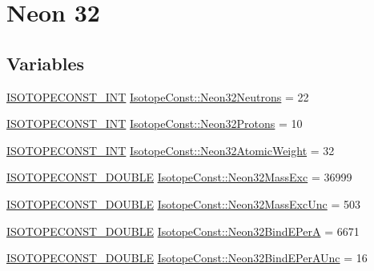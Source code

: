 \hypertarget{group___isotope_const-_neon-_ne32}{}\section{Neon 32}
\label{group___isotope_const-_neon-_ne32}
\subsection*{Variables}
\begin{DoxyCompactItemize}
\item 
\mbox{\hyperlink{group___isotope_const-_macros_ga5f18360b3e99483a35c32d789e62621c}{I\+S\+O\+T\+O\+P\+E\+C\+O\+N\+S\+T\+\_\+\+I\+NT}} \mbox{\hyperlink{group___isotope_const-_neon-_ne32_ga5e846bbd0eb998e702ce6f77fc617552}{Isotope\+Const\+::\+Neon32\+Neutrons}} = 22
\item 
\mbox{\hyperlink{group___isotope_const-_macros_ga5f18360b3e99483a35c32d789e62621c}{I\+S\+O\+T\+O\+P\+E\+C\+O\+N\+S\+T\+\_\+\+I\+NT}} \mbox{\hyperlink{group___isotope_const-_neon-_ne32_gad8efc12e76bb74394a4ba20f01ac3645}{Isotope\+Const\+::\+Neon32\+Protons}} = 10
\item 
\mbox{\hyperlink{group___isotope_const-_macros_ga5f18360b3e99483a35c32d789e62621c}{I\+S\+O\+T\+O\+P\+E\+C\+O\+N\+S\+T\+\_\+\+I\+NT}} \mbox{\hyperlink{group___isotope_const-_neon-_ne32_gabaacca718fb7fe14617212452894d793}{Isotope\+Const\+::\+Neon32\+Atomic\+Weight}} = 32
\item 
\mbox{\hyperlink{group___isotope_const-_macros_ga8f45a7272ce02c0b4c65c44636ed719a}{I\+S\+O\+T\+O\+P\+E\+C\+O\+N\+S\+T\+\_\+\+D\+O\+U\+B\+LE}} \mbox{\hyperlink{group___isotope_const-_neon-_ne32_ga2386a206a2cabdcde4e43b9f85384341}{Isotope\+Const\+::\+Neon32\+Mass\+Exc}} = 36999
\item 
\mbox{\hyperlink{group___isotope_const-_macros_ga8f45a7272ce02c0b4c65c44636ed719a}{I\+S\+O\+T\+O\+P\+E\+C\+O\+N\+S\+T\+\_\+\+D\+O\+U\+B\+LE}} \mbox{\hyperlink{group___isotope_const-_neon-_ne32_ga7c937b973738dce54a61355ca40241fb}{Isotope\+Const\+::\+Neon32\+Mass\+Exc\+Unc}} = 503
\item 
\mbox{\hyperlink{group___isotope_const-_macros_ga8f45a7272ce02c0b4c65c44636ed719a}{I\+S\+O\+T\+O\+P\+E\+C\+O\+N\+S\+T\+\_\+\+D\+O\+U\+B\+LE}} \mbox{\hyperlink{group___isotope_const-_neon-_ne32_ga2535174021e0dd0e4ad55bcebbb61acc}{Isotope\+Const\+::\+Neon32\+Bind\+E\+PerA}} = 6671
\item 
\mbox{\hyperlink{group___isotope_const-_macros_ga8f45a7272ce02c0b4c65c44636ed719a}{I\+S\+O\+T\+O\+P\+E\+C\+O\+N\+S\+T\+\_\+\+D\+O\+U\+B\+LE}} \mbox{\hyperlink{group___isotope_const-_neon-_ne32_ga6c5a995e0f6a4ac9befab4cde5b0a26d}{Isotope\+Const\+::\+Neon32\+Bind\+E\+Per\+A\+Unc}} = 16

\end{DoxyCompactItemize}
